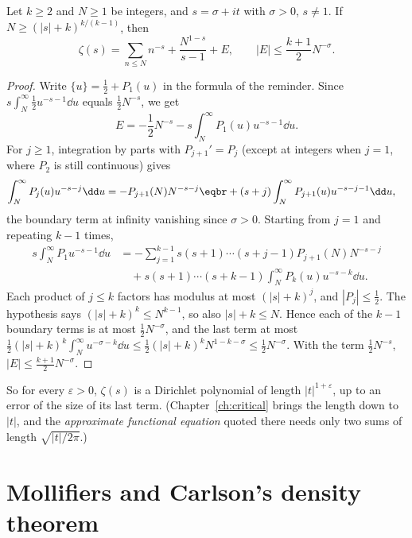 \begin{lemma}\label{lem:em}
Let $k\ge2$ and $N\ge1$ be integers, and $s=\sigma+it$ with $\sigma>0$, $s\ne1$. If $N\ge(|s|+k)^{k/(k-1)}$, then
\[
\zeta(s)=\sum_{n\le N}n^{-s}+\frac{N^{1-s}}{s-1}+E,\qquad|E|\le\frac{k+1}2N^{-\sigma}.
\]
\end{lemma}
\begin{proof}
Write $\{u\}=\frac12+P_1(u)$ in the formula of the reminder. Since $s\int_N^\infty\frac12u^{-s-1}\dd u$ equals $\frac12N^{-s}$, we get
\[
E=-\frac12N^{-s}-s\int_N^\infty P_1(u)u^{-s-1}\dd u.
\]
For $j\ge1$, integration by parts with $P_{j+1}'=P_j$ (except at integers when $j=1$, where $P_2$ is still continuous) gives
\[
\begin{aligned}\int_N^\infty P_j(u)u^{-s-j}\dd u&=-P_{j+1}(N)N^{-s-j}\eqbr+(s+j)\int_N^\infty P_{j+1}(u)u^{-s-j-1}\dd u,\end{aligned}
\]
the boundary term at infinity vanishing since $\sigma>0$. Starting from $j=1$ and repeating $k-1$ times,
\[
\begin{aligned}s\int_N^\infty P_1u^{-s-1}\dd u&=-\sum_{j=1}^{k-1}s(s+1)\cdots(s+j-1)P_{j+1}(N)N^{-s-j}\\&\quad+s(s+1)\cdots(s+k-1)\int_N^\infty P_k(u)u^{-s-k}\dd u.\end{aligned}
\]
Each product of $j\le k$ factors has modulus at most $(|s|+k)^j$, and $|P_j|\le\frac12$. The hypothesis says $(|s|+k)^k\le N^{k-1}$, so also $|s|+k\le N$. Hence each of the $k-1$ boundary terms is at most $\frac12N^{-\sigma}$, and the last term at most
$\frac12(|s|+k)^k\int_N^\infty u^{-\sigma-k}\dd u\le\frac12(|s|+k)^kN^{1-k-\sigma}\le\frac12N^{-\sigma}$. With the term $\frac12N^{-s}$, $|E|\le\frac{k+1}2N^{-\sigma}$.
\end{proof}

So for every $\varepsilon>0$, $\zeta(s)$ is a Dirichlet polynomial of length $|t|^{1+\varepsilon}$, up to an error of the size of its last term. (Chapter~\ref{ch:critical} brings the length down to $|t|$, and the \emph{approximate functional equation} quoted there needs only two sums of length $\sqrt{|t|/2\pi}$.)

\section{Mollifiers and Carlson's density theorem}

